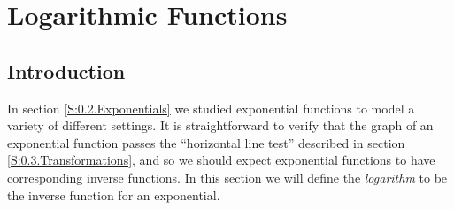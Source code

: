 \section{Logarithmic Functions} \label{S:0.4.Logarithms}


\vspace*{-14 pt}



\nin \hrulefill


\subsection*{Introduction}

In section \ref{S:0.2.Exponentials} we studied exponential functions to model a
variety of different settings.  It is straightforward to verify that the graph of an
exponential function passes the ``horizontal line test'' described in section
\ref{S:0.3.Transformations}, and so we should expect exponential functions to have
corresponding inverse functions.  In this section we will define the \emph{logarithm} to
be the inverse function for an exponential.

